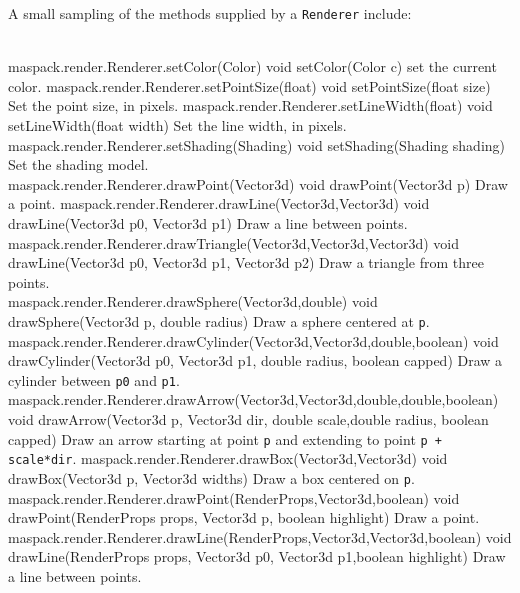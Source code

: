 A small sampling of the methods supplied by a {\tt Renderer} include:
%
\begin{methodtable}{0.62}{0.38}
\midline
{}\\
\midline
%
\methodentry
{maspack.render.Renderer.setColor(Color)}%
{void setColor(Color c)}%
{set the current color.}%
%
\methodentry
{maspack.render.Renderer.setPointSize(float)}%
{void setPointSize(float size)}%
{Set the point size, in pixels.}%
%
\methodentry
{maspack.render.Renderer.setLineWidth(float)}%
{void setLineWidth(float width)}%
{Set the line width, in pixels.}%
%
\methodentry
{maspack.render.Renderer.setShading(Shading)}%
{void setShading(Shading shading)}%
{Set the shading model.}%
%
\midline
{}\\
\midline
%
\methodentry
{maspack.render.Renderer.drawPoint(Vector3d)}%
{void drawPoint(Vector3d p)}%
{Draw a point.}%
%
\methodentry
{maspack.render.Renderer.drawLine(Vector3d,Vector3d)}%
{void drawLine(Vector3d p0, Vector3d p1)}%
{Draw a line between points.}%
%
\methodentry
{maspack.render.Renderer.drawTriangle(Vector3d,Vector3d,Vector3d)}%
{void drawLine(Vector3d p0, Vector3d p1, Vector3d p2)}%
{Draw a triangle from three points.}%
%
\midline
{}\\
\midline
%
\methodentry
{maspack.render.Renderer.drawSphere(Vector3d,double)}%
{void drawSphere(Vector3d p, double radius)}%
{Draw a sphere centered at {\tt p}.}%
%
\methodentry
{maspack.render.Renderer.drawCylinder(Vector3d,Vector3d,double,boolean)}%
{void drawCylinder(Vector3d p0, Vector3d p1, double radius, \brh boolean capped)}%
{Draw a cylinder between {\tt p0} and {\tt p1}.}%
%
\methodentry
{maspack.render.Renderer.drawArrow(Vector3d,Vector3d,double,double,boolean)}%
{void drawArrow(Vector3d p, Vector3d dir, double scale,\brh double radius, boolean capped)}%
{Draw an arrow starting at point {\tt p} and extending to point {\tt p + scale*dir}.}%
%
\methodentry
{maspack.render.Renderer.drawBox(Vector3d,Vector3d)}%
{void drawBox(Vector3d p, Vector3d widths)}%
{Draw a box centered on {\tt p}.}%
%
\midline
{}\\
\midline
%
\methodentry
{maspack.render.Renderer.drawPoint(RenderProps,Vector3d,boolean)}%
{void drawPoint(RenderProps props, Vector3d p, boolean highlight)}%
{Draw a point.}%
\methodentry
{maspack.render.Renderer.drawLine(RenderProps,Vector3d,Vector3d,boolean)}%
{void drawLine(RenderProps props, Vector3d p0, Vector3d p1,\brh boolean highlight)}%
{Draw a line between points.}%
%
\midline
\end{methodtable}
%

